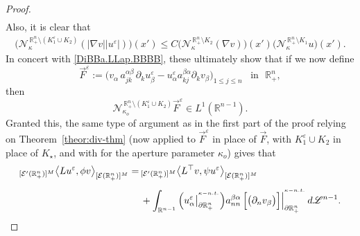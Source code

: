\documentclass[10pt,a4paper]{amsart}
\begin{document}
\begin{proof}
\begin{align}
\end{align}
%
Also, it is clear that 
%
\begin{align}\label{Cr654.A-HM.2-b22.bb}
\big({\mathcal{N}}^{\,\mathbb{R}^{n}_{+}\setminus (K_1^\varepsilon\cup K_2)}_{\kappa}(|\nabla v||u^\varepsilon|)\big)(x')
\leq C\big({\mathcal{N}}^{\,\mathbb{R}^{n}_{+}\setminus K_2}_{\kappa}(\nabla v)\big)(x')
\big({\mathcal{N}}^{\,\mathbb{R}^{n}_{+}\setminus K_1}_{\kappa}u\big)(x').
\end{align}
%
In concert with \eqref{DiBBa.LLap.BBBB}, these ultimately show that if we now define 
%
\begin{equation}\label{Yab-HBBaR46-bis}
\vec{F}^\varepsilon:=\Big(v_{\alpha}\,a^{\alpha\beta}_{jk}\,\partial_k u^\varepsilon_\beta
-u^\varepsilon_\alpha a^{\beta\alpha}_{kj}\partial_k v_{\beta}\Big)_{1\le j\le n}
\,\,\,\text{ in }\,\,{\mathbb{R}}^n_{+},
\end{equation}
%
then 
%
\begin{equation}\label{Yab-HBna-TAn.2-bis}
{\mathcal{N}}^{\,\mathbb{R}^{n}_{+}\setminus(K_1^\varepsilon\cup K_2)}_{\kappa_o}\vec{F}^\varepsilon\in L^1({\mathbb{R}}^{n-1}).
\end{equation}
%
Granted this, the same type of argument as in the first part of the proof 
relying on Theorem~\ref{theor:div-thm} (now applied to $\vec{F}^\varepsilon$ in place of $\vec{F}$, with 
$K_1^\varepsilon\cup K_2$ in place of $K_\star$, and with for the aperture parameter $\kappa_o$) gives that
%
\begin{align}\label{Ua-eDPa4.LAC}
{}_{[{\mathcal{E}}'(\mathbb{R}^{n}_{+})]^M}\big\langle Lu^\varepsilon,\phi v
\big\rangle_{[{\mathcal{E}}(\mathbb{R}^{n}_{+})]^M}
=&\,{}_{[{\mathcal{E}}'(\mathbb{R}^{n}_{+})]^M}\big\langle L^{\top}v,
\psi u^\varepsilon\big\rangle_{[{\mathcal{E}}(\mathbb{R}^{n}_{+})]^M}
\nonumber\\[4pt]
&\,+\int_{\mathbb{R}^{n-1}}
\Big(u^\varepsilon_\alpha\big|_{\partial\mathbb{R}^{n}_{+}}^{{}^{\kappa-{\rm n.t.}}}\Big) 
a^{\beta\alpha}_{nn}\,\Big[\big(\partial_n v_\beta\big)\Big]
\Big|_{\partial\mathbb{R}^{n}_{+}}^{{}^{\kappa-{\rm n.t.}}}\,d{\mathscr{L}}^{n-1}.
\end{align}


\end{proof}
\end{document}
